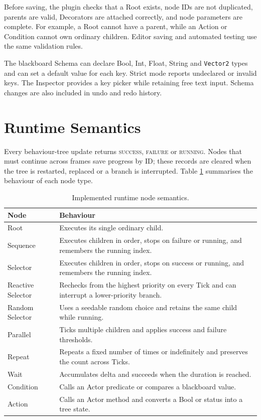 Before saving, the plugin checks that a Root exists, node IDs are not duplicated, parents are valid, Decorators are attached correctly, and node parameters are complete. For example, a Root cannot have a parent, while an Action or Condition cannot own ordinary children. Editor saving and automated testing use the same validation rules.

The blackboard Schema can declare Bool, Int, Float, String and \texttt{Vector2} types and can set a default value for each key. Strict mode reports undeclared or invalid keys. The Inspector provides a key picker while retaining free text input. Schema changes are also included in undo and redo history.

\section{Runtime Semantics}

Every behaviour-tree update returns \textsc{success}, \textsc{failure} or \textsc{running}. Nodes that must continue across frames save progress by ID; these records are cleared when the tree is restarted, replaced or a branch is interrupted. Table \ref{tab:nodes} summarises the behaviour of each node type.

\begin{table}[htbp]
\centering
\caption{Implemented runtime node semantics.}\label{tab:nodes}
\begin{tabular}{p{}p{}}
\toprule Node & Behaviour \\
\midrule
Root & Executes its single ordinary child.\\
Sequence & Executes children in order, stops on failure or running, and remembers the running index.\\
Selector & Executes children in order, stops on success or running, and remembers the running index.\\
Reactive Selector & Rechecks from the highest priority on every Tick and can interrupt a lower-priority branch.\\
Random Selector & Uses a seedable random choice and retains the same child while running.\\
Parallel & Ticks multiple children and applies success and failure thresholds.\\
Repeat & Repeats a fixed number of times or indefinitely and preserves the count across Ticks.\\
Wait & Accumulates delta and succeeds when the duration is reached.\\
Condition & Calls an Actor predicate or compares a blackboard value.\\
Action & Calls an Actor method and converts a Bool or status into a tree state.\\
\bottomrule
\end{tabular}
\end{table}

